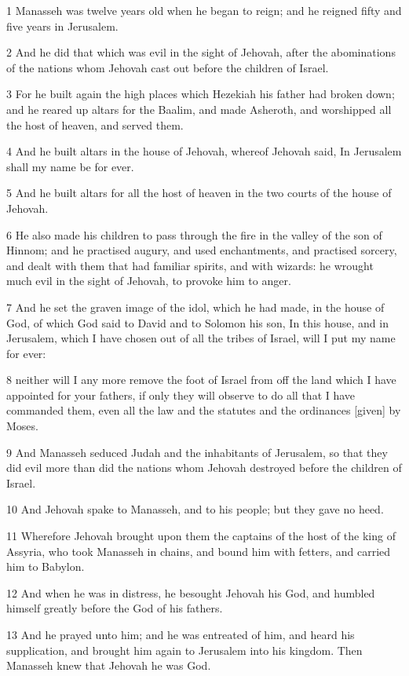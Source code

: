 \par 1 Manasseh was twelve years old when he began to reign; and he reigned fifty and five years in Jerusalem.
\par 2 And he did that which was evil in the sight of Jehovah, after the abominations of the nations whom Jehovah cast out before the children of Israel.
\par 3 For he built again the high places which Hezekiah his father had broken down; and he reared up altars for the Baalim, and made Asheroth, and worshipped all the host of heaven, and served them.
\par 4 And he built altars in the house of Jehovah, whereof Jehovah said, In Jerusalem shall my name be for ever.
\par 5 And he built altars for all the host of heaven in the two courts of the house of Jehovah.
\par 6 He also made his children to pass through the fire in the valley of the son of Hinnom; and he practised augury, and used enchantments, and practised sorcery, and dealt with them that had familiar spirits, and with wizards: he wrought much evil in the sight of Jehovah, to provoke him to anger.
\par 7 And he set the graven image of the idol, which he had made, in the house of God, of which God said to David and to Solomon his son, In this house, and in Jerusalem, which I have chosen out of all the tribes of Israel, will I put my name for ever:
\par 8 neither will I any more remove the foot of Israel from off the land which I have appointed for your fathers, if only they will observe to do all that I have commanded them, even all the law and the statutes and the ordinances [given] by Moses.
\par 9 And Manasseh seduced Judah and the inhabitants of Jerusalem, so that they did evil more than did the nations whom Jehovah destroyed before the children of Israel.
\par 10 And Jehovah spake to Manasseh, and to his people; but they gave no heed.
\par 11 Wherefore Jehovah brought upon them the captains of the host of the king of Assyria, who took Manasseh in chains, and bound him with fetters, and carried him to Babylon.
\par 12 And when he was in distress, he besought Jehovah his God, and humbled himself greatly before the God of his fathers.
\par 13 And he prayed unto him; and he was entreated of him, and heard his supplication, and brought him again to Jerusalem into his kingdom. Then Manasseh knew that Jehovah he was God.
